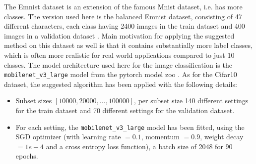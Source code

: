 \documentclass{article} %
\begin{document}
The Emnist dataset is an extension of the famous Mnist dataset, i.e. has more classes. The version used here is the balanced Emnist dataset, consisting of 47 different characters, each class having 2400 images in the train dataset and 400 images in a validation dataset \cite{cohen2017emnist}.  
Main motivation for applying the suggested method on this dataset as well is that it contains substantially more label classes, which is often more realistic for real world applications compared to just 10 classes.
The model architecture used here for the image classification is the \verb|mobilenet_v3_large| model from the pytorch model zoo \cite{howard2019mobilenetv3}.
As for the Cifar10 dataset, the suggested algorithm has been applied with the following details:
\begin{itemize}
    \item Subset sizes $[10000, 20000, \dots, 100000]$, per subset size 140 different settings for the train dataset and 70 different settings for the validation dataset.
    \item For each setting, the \verb|mobilenet_v3_large| model has been fitted, using the SGD optimizer (with learning rate $=0.1$, momentum $=0.9$, weight decay $=1e-4$ and a cross entropy loss function), a batch size of 2048 for 90 epochs. 
\end{itemize}
\end{document}
